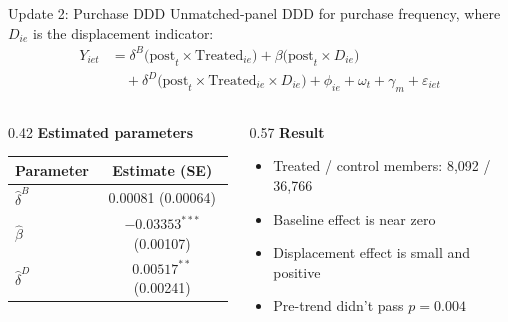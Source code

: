 \documentclass[aspectratio=169]{beamer}  %
\begin{document}
\begin{frame}{Update 2: Purchase DDD}
Unmatched-panel DDD for purchase frequency, where $D_{ie}$ is the displacement indicator:
\begingroup
\small
\[
\begin{aligned}
Y_{iet} &= \delta^B \bigl(\text{post}_{t} \times \text{Treated}_{ie}\bigr)
+ \beta \bigl(\text{post}_{t} \times D_{ie}\bigr) \\
&\quad + \delta^D \bigl(\text{post}_{t} \times \text{Treated}_{ie} \times D_{ie}\bigr)
+ \phi_{ie} + \omega_t + \gamma_m + \varepsilon_{iet}
\end{aligned}
\]
\endgroup

\begin{columns}[T]
\begin{column}{0.42\linewidth}
\textbf{Estimated parameters}
\begin{table}[h]
\centering
\scriptsize
\begin{tabular}{lc}
\toprule
Parameter & Estimate (SE) \\
\midrule
$\hat{\delta}^B$ & 0.00081 (0.00064) \\
$\hat{\beta}$ & $-0.03353^{***}$ (0.00107) \\
$\hat{\delta}^D$ & $0.00517^{**}$ (0.00241) \\
\bottomrule
\end{tabular}
\end{table}
\end{column}
\begin{column}{0.57\linewidth}
\textbf{Result}
\begin{itemize}
    \item Treated / control members: 8,092 / 36,766
    \item Baseline effect is near zero
    \item Displacement effect is small and positive
    \item Pre-trend didn't pass $p=0.004$
\end{itemize}
\end{column}
\end{columns}
\end{frame}
\end{document}
